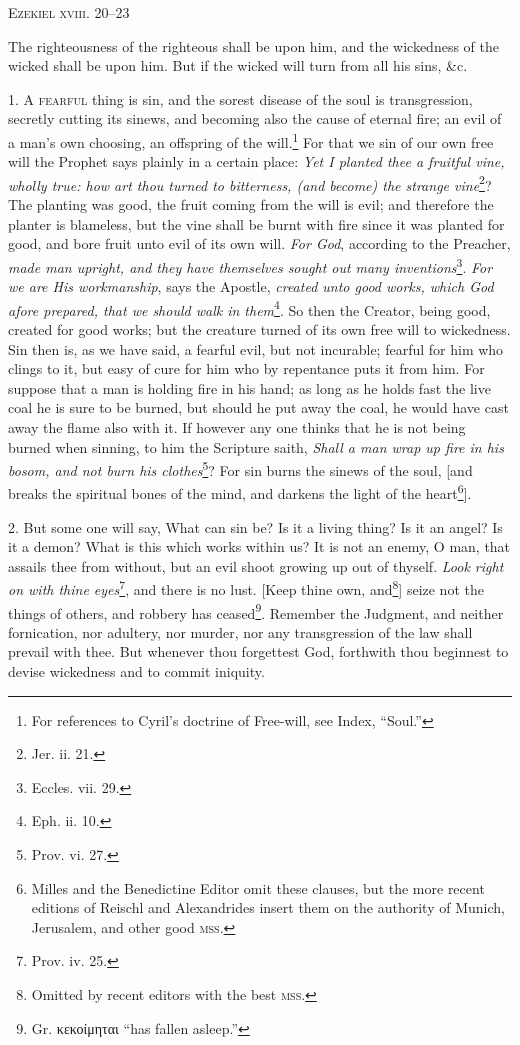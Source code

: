 
\textsc{Ezekiel xviii. 20–23}

The righteousness of the righteous shall be upon him, and the wickedness of the wicked shall be upon him. But if the wicked will turn from all his sins, \&c.

1. \textsc{A fearful} thing is sin, and the sorest disease of the soul is transgression, secretly cutting its sinews, and becoming also the cause of eternal fire; an evil of a man’s own choosing, an offspring of the will.\footnote{For references to Cyril’s doctrine of Free-will, see Index, “Soul.”} For that we sin of our own free will the Prophet says plainly in a certain place: \emph{Yet I planted thee a fruitful vine, wholly true: how art thou turned to bitterness, (and become) the strange vine}\footnote{Jer. ii. 21.}? The planting was good, the fruit coming from the will is evil; and therefore the planter is blameless, but the vine shall be burnt with fire since it was planted for good, and bore fruit unto evil of its own will. \emph{For God}, according to the Preacher, \emph{made man upright, and they have themselves sought out many inventions}\footnote{Eccles. vii. 29.}. \emph{For we are His workmanship}, says the Apostle, \emph{created unto good works, which God afore prepared, that we should walk in them}\footnote{Eph. ii. 10.}. So then the Creator, being good, created for good works; but the creature turned of its own free will to wickedness. Sin then is, as we have said, a fearful evil, but not incurable; fearful for him who clings to it, but easy of cure for him who by repentance puts it from him. For suppose that a man is holding fire in his hand; as long as he holds fast the live coal he is sure to be burned, but should he put away the coal, he would have cast away the flame also with it. If however any one thinks that he is not being burned when sinning, to him the Scripture saith, \emph{Shall a man wrap up fire in his bosom, and not burn his clothes}\footnote{Prov. vi. 27.}? For sin burns the sinews of the soul, [and breaks the spiritual bones of the mind, and darkens the light of the heart\footnote{Milles and the Benedictine Editor omit these clauses, but the more recent editions of Reischl and Alexandrides insert them on the authority of Munich, Jerusalem, and other good \textsc{mss.}}].

2. But some one will say, What can sin be? Is it a living thing? Is it an angel? Is it a demon? What is this which works within us? It is not an enemy, O man, that assails thee from without, but an evil shoot growing up out of thyself. \emph{Look right on with thine eyes}\footnote{Prov. iv. 25.}, and there is no lust. [Keep thine own, and\footnote{Omitted by recent editors with the best \textsc{mss.}}] seize not the things of others, and robbery has ceased\footnote{Gr. \textgreek{κεκοίμηται} “has fallen asleep.”}. Remember the Judgment, and neither fornication, nor adultery, nor murder, nor any transgression of the law shall prevail with thee. But whenever thou forgettest God, forthwith thou beginnest to devise wickedness and to commit iniquity.

